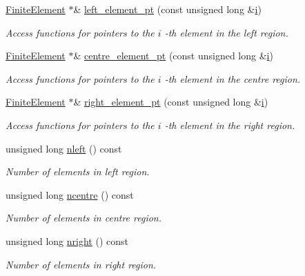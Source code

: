 \begin{DoxyCompactItemize}
\hyperlink{classoomph_1_1FiniteElement}{Finite\+Element} $\ast$\& \hyperlink{classoomph_1_1ChannelSpineMesh_a84cbf50caead0aba0170246f4ce7330f}{left\+\_\+element\+\_\+pt} (const unsigned long \&\hyperlink{cfortran_8h_adb50e893b86b3e55e751a42eab3cba82}{i})
\begin{DoxyCompactList}\small\item\em Access functions for pointers to the $ i $ -\/th element in the left region. \end{DoxyCompactList}\item 
\hyperlink{classoomph_1_1FiniteElement}{Finite\+Element} $\ast$\& \hyperlink{classoomph_1_1ChannelSpineMesh_a127dc05f48ad6af69f26dd1504eaeba5}{centre\+\_\+element\+\_\+pt} (const unsigned long \&\hyperlink{cfortran_8h_adb50e893b86b3e55e751a42eab3cba82}{i})
\begin{DoxyCompactList}\small\item\em Access functions for pointers to the $ i $ -\/th element in the centre region. \end{DoxyCompactList}\item 
\hyperlink{classoomph_1_1FiniteElement}{Finite\+Element} $\ast$\& \hyperlink{classoomph_1_1ChannelSpineMesh_a599b1d10bc47ceb9903a01b12036f400}{right\+\_\+element\+\_\+pt} (const unsigned long \&\hyperlink{cfortran_8h_adb50e893b86b3e55e751a42eab3cba82}{i})
\begin{DoxyCompactList}\small\item\em Access functions for pointers to the $ i $ -\/th element in the right region. \end{DoxyCompactList}\item 
unsigned long \hyperlink{classoomph_1_1ChannelSpineMesh_a6f7b8f540855876e49b5f1c3f0214d9a}{nleft} () const
\begin{DoxyCompactList}\small\item\em Number of elements in left region. \end{DoxyCompactList}\item 
unsigned long \hyperlink{classoomph_1_1ChannelSpineMesh_a422ed0d224b8da3c35732328e1aacdc0}{ncentre} () const
\begin{DoxyCompactList}\small\item\em Number of elements in centre region. \end{DoxyCompactList}\item 
unsigned long \hyperlink{classoomph_1_1ChannelSpineMesh_a559352375de869e889191d0e6c133031}{nright} () const
\begin{DoxyCompactList}\small\item\em Number of elements in right region. \end{DoxyCompactList}\item 

\end{DoxyCompactItemize}
